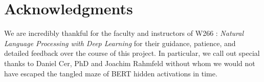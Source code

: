 \section*{Acknowledgments}

We are incredibly thankful for the faculty and instructors of W266 : \textit{Natural Language Processing with Deep Learning} for their guidance, patience, and detailed feedback over the course of this project. In particular, we call out special thanks to Daniel Cer, PhD and Joachim Rahmfeld without whom we would not have escaped the tangled maze of BERT hidden activations in time.